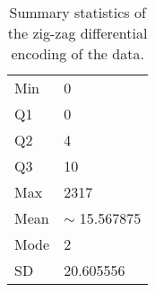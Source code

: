 \begin{table}
    \caption{\label{tab:diff} Summary statistics of the zig-zag differential encoding of the data.}
    \begin{tabular}{|l|l|}
        \hline
Min & 0\\
	    Q1 & 0\\

Q2 & 4\\
	    Q3 & 10\\
Max & 2317\\
\hline
Mean & $\sim$ 15.567875\\
	    Mode & 2\\
SD & 20.605556\\
	\hline
    \end{tabular}
\end{table}

